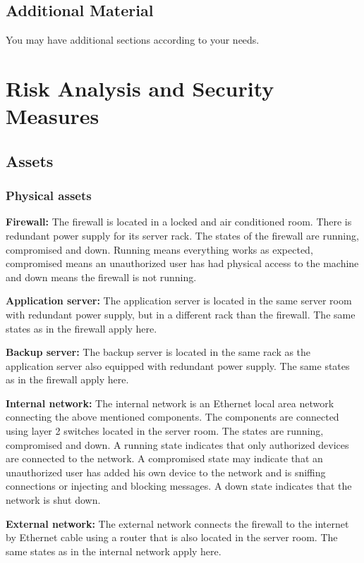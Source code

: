 \documentclass[english]{article}
\begin{document}
\subsection{Additional Material}

You may have additional sections according to your needs.


\section{Risk Analysis and Security Measures}

\subsection{Assets}

\subsubsection{Physical assets}

	\begin{description}
		\item{\textbf{Firewall:}} The firewall is located in a locked and air conditioned room. There is redundant power supply for its server rack. The states of the firewall are running, compromised and down. Running means everything works as expected, compromised means an unauthorized user has had physical access to the machine and down means the firewall is not running.
		\item{\textbf{Application server:}} The application server is located in the same server room with redundant power supply, but in a different rack than the firewall. The same states as in the firewall apply here.
		\item{\textbf{Backup server:}} The backup server is located in the same rack as the application server also equipped with redundant power supply. The same states as in the firewall apply here.
		\item{\textbf{Internal network:}} The internal network is an Ethernet local area network connecting the above mentioned components. The components are connected using layer 2 switches located in the server room. The states are running, compromised and down. A running state indicates that only authorized devices are connected to the network. A compromised state may indicate that an unauthorized user has added his own device to the network and is sniffing connections or injecting and blocking messages. A down state indicates that the network is shut down.
		\item{\textbf{External network:}} The external network connects the firewall to the internet by Ethernet cable using a router that is also located in the server room. The same states as in the internal network apply here.
	\end{description}
\end{document}
